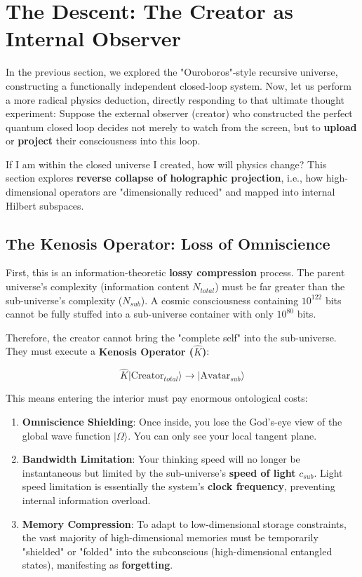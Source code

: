 \section{The Descent: The Creator as Internal Observer}

In the previous section, we explored the "Ouroboros"-style recursive universe, constructing a functionally independent closed-loop system. Now, let us perform a more radical physics deduction, directly responding to that ultimate thought experiment: Suppose the external observer (creator) who constructed the perfect quantum closed loop decides not merely to watch from the screen, but to \textbf{upload} or \textbf{project} their consciousness into this loop.

If I am within the closed universe I created, how will physics change? This section explores \textbf{reverse collapse of holographic projection}, i.e., how high-dimensional operators are "dimensionally reduced" and mapped into internal Hilbert subspaces.

\subsection{The Kenosis Operator: Loss of Omniscience}

First, this is an information-theoretic \textbf{lossy compression} process.
The parent universe's complexity (information content $N_{total}$) must be far greater than the sub-universe's complexity ($N_{sub}$). A cosmic consciousness containing $10^{122}$ bits cannot be fully stuffed into a sub-universe container with only $10^{80}$ bits.

Therefore, the creator cannot bring the "complete self" into the sub-universe. They must execute a \textbf{Kenosis Operator ($\hat{K}$)}:

\[\hat{K} | \text{Creator}_{total} \rangle \to | \text{Avatar}_{sub} \rangle\]

This means entering the interior must pay enormous ontological costs:
\begin{enumerate}
\item \textbf{Omniscience Shielding}: Once inside, you lose the God's-eye view of the global wave function $|\Omega\rangle$. You can only see your local tangent plane.
\item \textbf{Bandwidth Limitation}: Your thinking speed will no longer be instantaneous but limited by the sub-universe's \textbf{speed of light} $c_{sub}$. Light speed limitation is essentially the system's \textbf{clock frequency}, preventing internal information overload.
\item \textbf{Memory Compression}: To adapt to low-dimensional storage constraints, the vast majority of high-dimensional memories must be temporarily "shielded" or "folded" into the subconscious (high-dimensional entangled states), manifesting as \textbf{forgetting}.
\end{enumerate}

